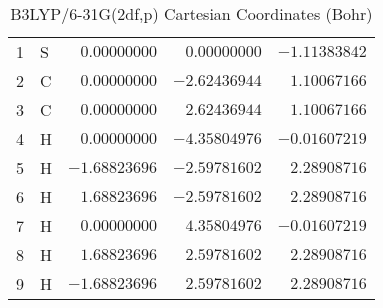 \documentclass[10pt,oneside]{article}
\begin{document}
\begin{table}[h!]
\centering
\caption{B3LYP/6-31G(2df,p) Cartesian Coordinates (Bohr)}
\begin{tabular}{llrrr}
1  & S  & $ 0.00000000$ & $ 0.00000000$ & $-1.11383842$ \\
2  & C  & $ 0.00000000$ & $-2.62436944$ & $ 1.10067166$ \\
3  & C  & $ 0.00000000$ & $ 2.62436944$ & $ 1.10067166$ \\
4  & H  & $ 0.00000000$ & $-4.35804976$ & $-0.01607219$ \\
5  & H  & $-1.68823696$ & $-2.59781602$ & $ 2.28908716$ \\
6  & H  & $ 1.68823696$ & $-2.59781602$ & $ 2.28908716$ \\
7  & H  & $ 0.00000000$ & $ 4.35804976$ & $-0.01607219$ \\
8  & H  & $ 1.68823696$ & $ 2.59781602$ & $ 2.28908716$ \\
9  & H  & $-1.68823696$ & $ 2.59781602$ & $ 2.28908716$ \\
\end{tabular}
\end{table}

\clearpage
\end{document}
